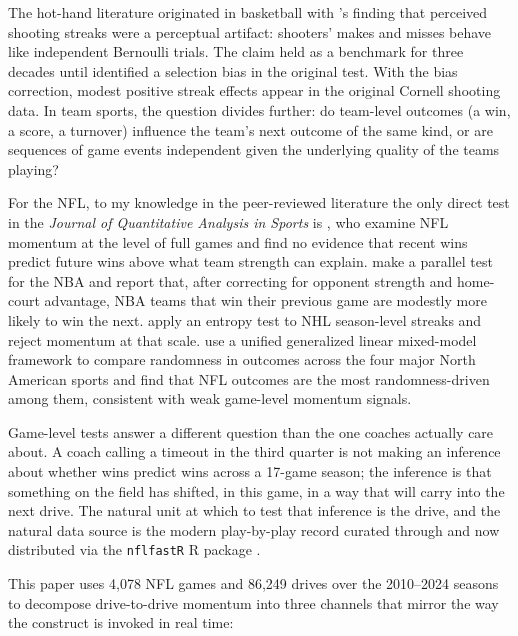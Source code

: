 \documentclass[11pt]{article}
\begin{document}
The hot-hand literature originated in basketball with
\citet{gilovich1985hot}'s finding that perceived shooting streaks were a
perceptual artifact: shooters' makes and misses behave like independent
Bernoulli trials. The claim held as a benchmark for three decades until
\citet{miller2018surprised} identified a selection bias in the original test.
With the bias correction, modest positive streak effects appear in the
original Cornell shooting data. In team sports, the question divides further:
do team-level outcomes (a win, a score, a turnover) influence the team's next
outcome of the same kind, or are sequences of game events independent given
the underlying quality of the teams playing?

For the NFL, to my knowledge in the peer-reviewed literature the only direct test in the \emph{Journal of
Quantitative Analysis in Sports} is \citet{fry2012searching}, who examine NFL
momentum at the level of full games and find no evidence that recent wins
predict future wins above what team strength can explain.
\citet{arkes2011finally} make a parallel test for the NBA and report that,
after correcting for opponent strength and home-court advantage, NBA teams
that win their previous game are modestly more likely to win the next.
\citet{steeger2021winning} apply an entropy test to NHL season-level streaks
and reject momentum at that scale. \citet{lopez2018often} use a unified
generalized linear mixed-model framework to compare randomness in outcomes
across the four major North American sports and find that NFL outcomes are
the most randomness-driven among them, consistent with weak game-level
momentum signals.

Game-level tests answer a different question than the one coaches actually
care about. A coach calling a timeout in the third quarter is not making an
inference about whether wins predict wins across a 17-game season; the
inference is that something on the field has shifted, in this game, in a way
that will carry into the next drive. The natural unit at which to test that
inference is the drive, and the natural data source is the modern play-by-play
record curated through \citet{yurko2018nflwar} and now distributed via the
\texttt{nflfastR} R package \citep{nflfastr2024}.

This paper uses 4{,}078 NFL games and 86{,}249 drives over the 2010--2024
seasons to decompose drive-to-drive momentum into three channels that mirror
the way the construct is invoked in real time:
\end{document}
